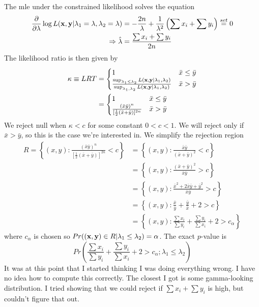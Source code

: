 \documentclass[12pt]{article}
\begin{document}
\noindent The mle under the constrained likelihood solves the equation
\begin{align*}
\frac{\partial}{\partial \lambda}\log L(\mathbf{\bm{x}},\mathbf{\bm{y}}|\lambda_1=\lambda,\lambda_2=\lambda) &= -\frac{2n}{\lambda} + \frac{1}{\lambda^2}\left(\sum x_i + \sum y_i\right) \overset{set}= 0 \\
\Rightarrow \hat\lambda &= \frac{\sum x_i + \sum y_i}{2n}
\end{align*}
\noindent The likelihood ratio is then given by
\begin{align*}
\kappa \equiv LRT &= \begin{cases} 1 & \bar x \leq \bar y \\ \frac{\sup_{\lambda_1\leq\lambda_2}L(\mathbf{\bm{x}},\mathbf{\bm{y}}|\lambda_1,\lambda_2)}{\sup_{\lambda_1,\lambda_2}L(\mathbf{\bm{x}},\mathbf{\bm{y}}|\lambda_1,\lambda_2)} & \bar x > \bar y \end{cases} \\
&= \begin{cases} 1 & \bar x \leq \bar y \\ \frac{(\bar x \bar y)^n}{[\frac{1}{2}(\bar x + \bar y)]^{2n}} & \bar x > \bar y \end{cases} \\
\end{align*}
\noindent We reject null when $\kappa<c$ for some constant $0<c<1$. We will reject only if $\bar x > \bar y$, so this is the case we're interested in. We simplify the rejection region
\begin{align*}
R = \left\{(x,y):\frac{(\bar x\bar y)^n}{[\frac{1}{2}(\bar x + \bar y)]^{2n}} < c \right\} &= \left\{(x,y):\frac{\bar x\bar y}{(\bar x + \bar y)^2} < c \right\}  \\
&= \left\{(x,y):\frac{(\bar x + \bar y)^2}{\bar x \bar y} > c \right\}  \\
&= \left\{(x,y):\frac{\bar x^2 + 2\bar x\bar y + \bar y^2}{\bar x \bar y} > c \right\}  \\
&= \left\{(x,y):\frac{\bar x}{\bar y} + \frac{\bar y}{\bar x}+2 > c \right\}  \\
&= \left\{(x,y):\frac{\sum x_i}{\sum y_i} + \frac{\sum y_i}{\sum x_i}+2 > c_\alpha \right\}
\end{align*}
\noindent where $c_\alpha$ is chosen so $Pr((\mathbf{\bm{x}},\mathbf{\bm{y}})\in R|\lambda_1\leq\lambda_2)=\alpha$. The exact $p$-value is 
\[ Pr\left(\frac{\sum x_i}{\sum y_i} + \frac{\sum y_i}{\sum x_i}+2 > c_\alpha;\lambda_1\leq\lambda_2\right) \]
\noindent It was at this point that I started thinking I was doing everything wrong. I have no idea how to compute this correctly. The closest I got is some gamma-looking distribution. I tried showing that we could reject if $\sum x_i + \sum y_i$ is high, but couldn't figure that out.
\end{document}
